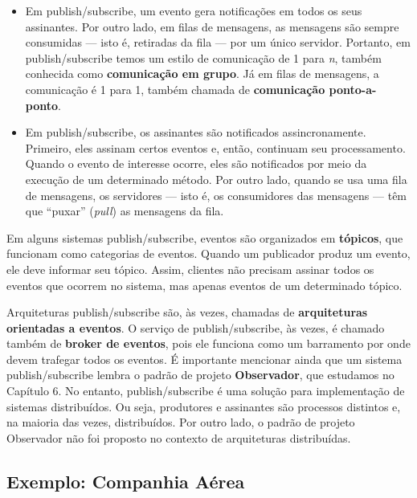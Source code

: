 \documentclass[
  11pt,
  twoside]{book}
\begin{document}
\begin{itemize}
\item
  Em publish/subscribe, um evento gera notificações em todos os seus
  assinantes. Por outro lado, em filas de mensagens, as mensagens são
  sempre consumidas --- isto é, retiradas da fila --- por um único
  servidor. Portanto, em publish/subscribe temos um estilo de
  comunicação de 1 para \emph{n}, também conhecida como
  \textbf{comunicação em grupo}. Já em filas de mensagens, a comunicação
  é 1 para 1, também chamada de \textbf{comunicação ponto-a-ponto}.
\item
  Em publish/subscribe, os assinantes são notificados assincronamente.
  Primeiro, eles assinam certos eventos e, então, continuam seu
  processamento. Quando o evento de interesse ocorre, eles são
  notificados por meio da execução de um determinado método. Por outro
  lado, quando se usa uma fila de mensagens, os servidores --- isto é,
  os consumidores das mensagens --- têm que ``puxar'' (\emph{pull}) as
  mensagens da fila.
\end{itemize}

Em alguns sistemas publish/subscribe, eventos são organizados em
\textbf{tópicos},  que funcionam como
categorias de eventos. Quando um publicador produz um evento, ele deve
informar seu tópico. Assim, clientes não precisam assinar todos os
eventos que ocorrem no sistema, mas apenas eventos de um determinado
tópico.

 
 Arquiteturas publish/subscribe são, às
vezes, chamadas de \textbf{arquiteturas orientadas a eventos}. O serviço
de publish/subscribe, às vezes, é chamado também de \textbf{broker de
eventos}, pois ele funciona como um barramento por onde devem trafegar
todos os eventos. É importante mencionar ainda que um sistema
publish/subscribe lembra o padrão de projeto \textbf{Observador}, que
estudamos no Capítulo 6. No entanto, publish/subscribe é uma solução
para implementação de sistemas distribuídos. Ou seja, produtores e
assinantes são processos distintos e, na maioria das vezes,
distribuídos. Por outro lado, o padrão de projeto Observador não foi
proposto no contexto de arquiteturas distribuídas.

\hypertarget{exemplo-companhia-auxe9rea}{%
\subsection{Exemplo: Companhia Aérea}\label{exemplo-companhia-auxe9rea}}
\end{document}
